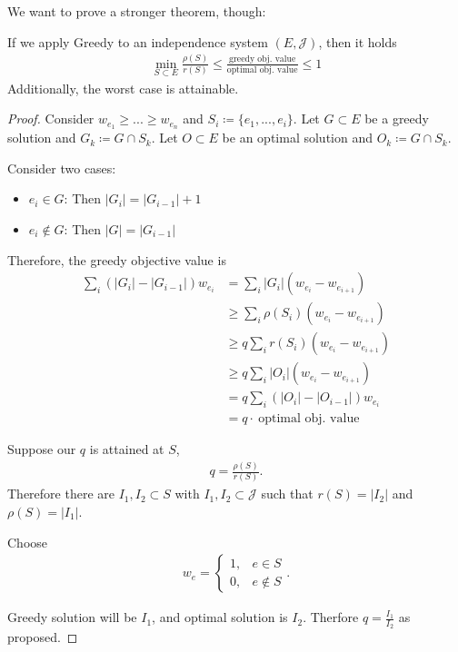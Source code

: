 We want to prove a stronger theorem, though:
\begin{theorem}
    If we apply Greedy to an independence system $(E, \mathcal{J})$, then it holds
    \begin{align*}
        \min_{S \subset E} \frac{\rho(S)}{r(S)}\leq \frac{\text{greedy obj. value}}{\text{optimal obj. value}} \leq 1
    \end{align*}    
    Additionally, the worst case is attainable.
\end{theorem}
\begin{proof}
    Consider $w_{e_1} \geq ... \geq w_{e_n}$ and $S_i\coloneqq\{e_1,...,e_i\}$.
    Let $G \subset E$ be a greedy solution and $G_k \coloneqq G \cap S_k$.
    Let $O \subset E$ be an optimal solution and $O_k \coloneqq G \cap S_k$.

    Consider two cases:
    \begin{itemize}
        \item $e_i \in G$: Then $|G_i| = |G_{i-1}| +1$
        \item $e_i \not \in G$: Then $|G|=|G_{i-1}|$
    \end{itemize}
    Therefore, the greedy objective value is 
    \begin{align*}
        \sum_i (|G_i| - |G_{i-1}|)w_{e_i} &= \sum_i |G_i|(w_{e_i} - w_{e_{i+1}})\\
        &\geq  \sum_i \rho(S_i)(w_{e_i} - w_{e_{i+1}})\\
        &\geq q \sum_i r(S_i)(w_{e_i} - w_{e_{i+1}})\\
        & \geq q \sum_i |O_i|(w_{e_i} - w_{e_{i+1}})\\
        &= q \sum_i (|O_i|-|O_{i-1}|)w_{e_i}\\
        &= q \cdot \ \text{optimal obj. value}
    \end{align*}

    Suppose our $q$ is attained at $S$,
    \begin{align*}
        q = \frac{\rho(S)}{r(S)}.
    \end{align*}
    Therefore there are $I_1,I_2 \subset S$ with $I_1,I_2 \subset \mathcal{J}$
    such that $r(S)=|I_2|$ and $\rho(S)=|I_1|$.

    Choose
    \begin{align*}
        w_e = \begin{cases}
            1, & e \in S\\
            0, & e \not \in S
        \end{cases}.
    \end{align*}

    Greedy solution will be $I_1$, and optimal solution is $I_2$.
    Therfore $q = \frac{I_1}{I_2}$ as proposed.

\end{proof}
